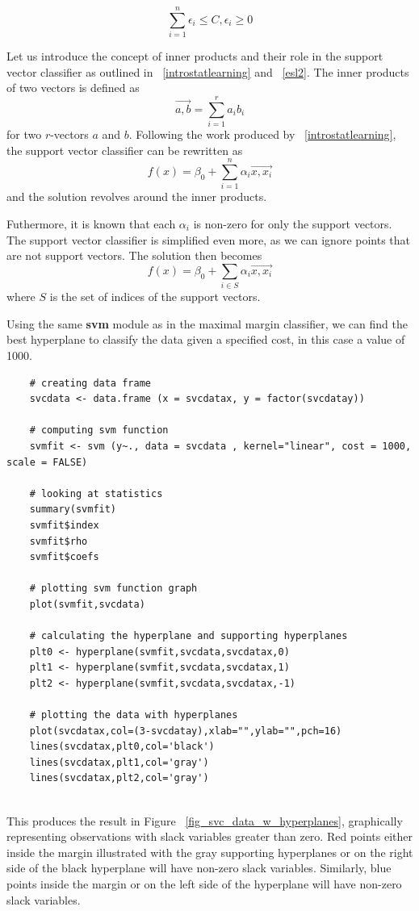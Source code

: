 \documentclass[12pt]{article}
\begin{document}
\begin{equation}\label{slackvariables}
\sum_{i=1}^{n} \epsilon_i \le C, \epsilon_i \ge 0
\end{equation}

Let us introduce the concept of inner products and their role in the support vector classifier as outlined in ~\ref{introstatlearning} and ~\ref{esl2}. The inner products of two vectors is defined as \[ \vec{a,b}=\sum_{i=1}^{r}a_ib_i \] for two \(r\)-vectors \(a\) and \(b\). Following the work produced by ~\ref{introstatlearning}, the support vector classifier can be rewritten as \[f(x) = \beta_0 + \sum_{i=1}^n \alpha_i \vec{x,x_i} \] and the solution revolves around the inner products.

Futhermore, it is known that each \(\alpha_i\) is non-zero for only the support vectors. The support vector classifier is simplified even more, as we can ignore points that are not support vectors. The solution then becomes \[f(x) = \beta_0 + \sum_{i \in S} \alpha_i \vec{x,x_i} \] where \(S\) is the set of indices of the support vectors.

Using the same \textbf{svm} module as in the maximal margin classifier, we can find the best hyperplane to classify the data given a specified cost, in this case a value of 1000.

\begin{verbatim}
    # creating data frame 
    svcdata <- data.frame (x = svcdatax, y = factor(svcdatay))
    
    # computing svm function
    svmfit <- svm (y~., data = svcdata , kernel="linear", cost = 1000, scale = FALSE)
    
    # looking at statistics
    summary(svmfit)
    svmfit$index
    svmfit$rho
    svmfit$coefs
    
    # plotting svm function graph
    plot(svmfit,svcdata)
    
    # calculating the hyperplane and supporting hyperplanes
    plt0 <- hyperplane(svmfit,svcdata,svcdatax,0)
    plt1 <- hyperplane(svmfit,svcdata,svcdatax,1)
    plt2 <- hyperplane(svmfit,svcdata,svcdatax,-1)
    
    # plotting the data with hyperplanes
    plot(svcdatax,col=(3-svcdatay),xlab="",ylab="",pch=16)
    lines(svcdatax,plt0,col='black')
    lines(svcdatax,plt1,col='gray')
    lines(svcdatax,plt2,col='gray')
    
\end{verbatim}

This produces the result in Figure ~\ref{fig_svc_data_w_hyperplanes}, graphically representing observations with slack variables greater than zero. Red points either inside the margin illustrated with the gray supporting hyperplanes or on the right side of the black hyperplane will have non-zero slack variables. Similarly, blue points inside the margin or on the left side of the hyperplane will have non-zero slack variables.
\end{document}
